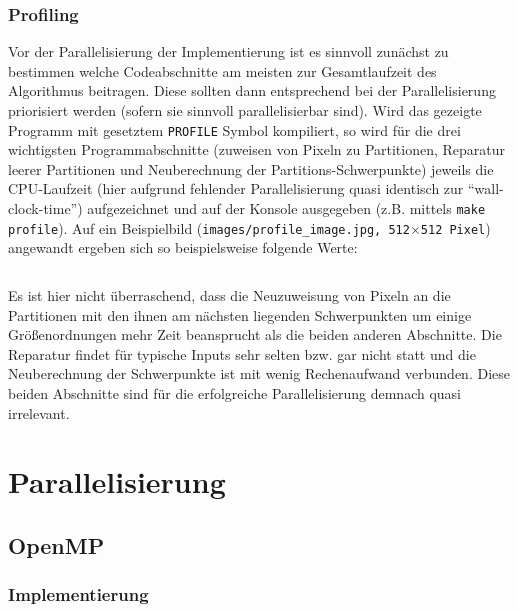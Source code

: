 \documentclass[
    bibliography=totoc, cd=lightcolor, cdmath=false, ngerman]{tudscrreprt}
\begin{document}
\subsection{Profiling}
Vor der Parallelisierung der Implementierung ist es sinnvoll zunächst zu
bestimmen welche Codeabschnitte am meisten zur Gesamtlaufzeit des Algorithmus
beitragen. Diese sollten dann entsprechend bei der Parallelisierung priorisiert
werden (sofern sie sinnvoll parallelisierbar sind). Wird das gezeigte Programm
mit gesetztem \texttt{PROFILE} Symbol kompiliert, so wird für die drei
wichtigsten Programmabschnitte (zuweisen von Pixeln zu Partitionen, Reparatur
leerer Partitionen und Neuberechnung der Partitions-Schwerpunkte) jeweils die
CPU-Laufzeit (hier aufgrund fehlender Parallelisierung quasi identisch zur
``wall-clock-time'') aufgezeichnet und auf der Konsole ausgegeben (z.B. mittels
\texttt{make profile}).  Auf ein Beispielbild
(\texttt{images/profile\_image.jpg, 512$\times$512 Pixel}) angewandt ergeben
sich so beispielsweise folgende Werte:

\inputminted[linenos=false]{text}{report/resources/profiling.txt}

Es ist hier nicht überraschend, dass die Neuzuweisung von Pixeln an die
Partitionen mit den ihnen am nächsten liegenden Schwerpunkten um einige
Größenordnungen mehr Zeit beansprucht als die beiden anderen Abschnitte.  Die
Reparatur findet für typische Inputs sehr selten bzw. gar nicht statt und die
Neuberechnung der Schwerpunkte ist mit wenig Rechenaufwand verbunden. Diese
beiden Abschnitte sind für die erfolgreiche Parallelisierung demnach quasi
irrelevant.

\chapter{Parallelisierung}

\section{OpenMP}

\subsection{Implementierung}
\end{document}
